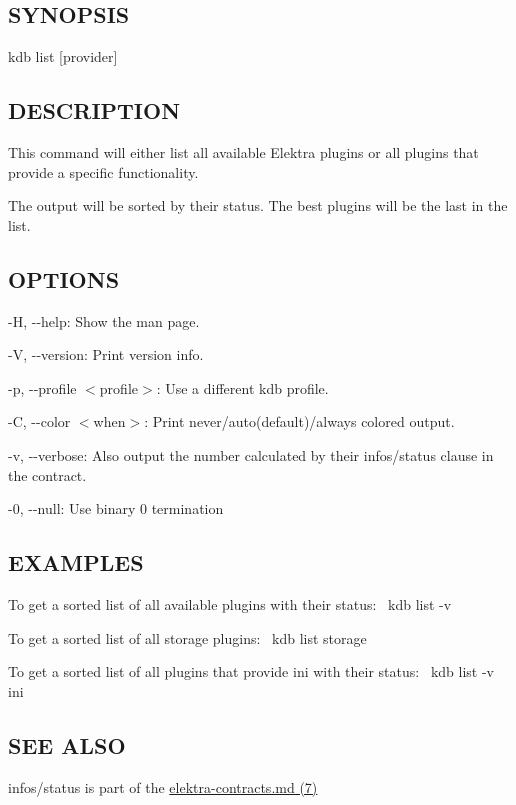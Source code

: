 \subsection*{S\+Y\+N\+O\+P\+S\+IS}

{\ttfamily kdb list \mbox{[}provider\mbox{]}}

\subsection*{D\+E\+S\+C\+R\+I\+P\+T\+I\+ON}

This command will either list all available Elektra plugins or all plugins that provide a specific functionality.

The output will be sorted by their status. The best plugins will be the last in the list.

\subsection*{O\+P\+T\+I\+O\+NS}


\begin{DoxyItemize}
\item {\ttfamily -\/H}, {\ttfamily -\/-\/help}\+: Show the man page.
\item {\ttfamily -\/V}, {\ttfamily -\/-\/version}\+: Print version info.
\item {\ttfamily -\/p}, {\ttfamily -\/-\/profile $<$profile$>$}\+: Use a different kdb profile.
\item {\ttfamily -\/C}, {\ttfamily -\/-\/color $<$when$>$}\+: Print never/auto(default)/always colored output.
\item {\ttfamily -\/v}, {\ttfamily -\/-\/verbose}\+: Also output the number calculated by their {\ttfamily infos/status} clause in the contract.
\item {\ttfamily -\/0}, {\ttfamily -\/-\/null}\+: Use binary 0 termination
\end{DoxyItemize}

\subsection*{E\+X\+A\+M\+P\+L\+ES}

To get a sorted list of all available plugins with their status\+:~\newline
 {\ttfamily kdb list -\/v}

To get a sorted list of all storage plugins\+:~\newline
 {\ttfamily kdb list storage}

To get a sorted list of all plugins that provide {\ttfamily ini} with their status\+:~\newline
 {\ttfamily kdb list -\/v ini}

\subsection*{S\+EE A\+L\+SO}


\begin{DoxyItemize}
\item {\ttfamily infos/status} is part of the \hyperlink{doc_help_elektra-contracts_md}{elektra-\/contracts.md (7)} 
\end{DoxyItemize}